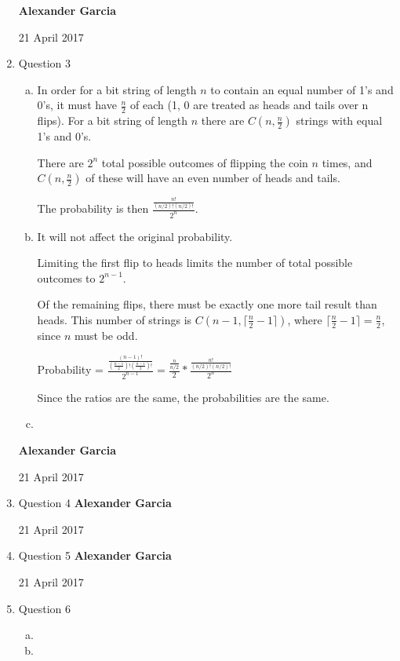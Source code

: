 \documentclass[11pt]{article}
\begin{document}
\begin{enumerate}
\begin{enumerate}[(a)]
			\end{enumerate}
\newpage
\textbf{Alexander Garcia}

21 April 2017 \\

		\item Question 3

			\begin{enumerate}[(a)]

				\item In order for a bit string of length $n$ to contain an equal number of 1's and 0's,
					it must have $\frac{n}{2}$ of each (1, 0 are treated as heads and tails over n flips).
					For a bit string of length $n$ there are $C(n, \frac{n}{2})$ strings with equal 1's and
					0's.

					There are $2^n$ total possible outcomes of flipping the coin $n$ times, and
					$C(n, \frac{n}{2})$ of these will have an even number of heads and tails.

					The probability is then $\frac{\frac{n!}{(n/2)!(n/2)!}}{2^n} $. \\

				\item It will not affect the original probability.

					Limiting the first flip to heads limits the number of total
					possible outcomes to $2^{n-1}$.

					Of the remaining flips, there must be exactly one more tail result than heads.
					This number of strings is $C(n-1, \lceil{\frac{n}{2} -1}\rceil)$, where
					$\lceil{\frac{n}{2} -1}\rceil = \frac{n}{2}$, since $n$ must be odd.

					Probability = $\frac{\frac{(n-1)!}{(\frac{n-1}{2})!(\frac{n-1}{2})!}}{2^{n-1}} =
					\frac{\frac{n}{n/2}}{2} * \frac{\frac{n!}{(n/2)!(n/2)!}}{2^n} $

					Since the ratios are the same, the probabilities are the same. \\

				\item

			\end{enumerate}
\newpage
\textbf{Alexander Garcia}

21 April 2017 \\

		\item Question 4
\newpage
\textbf{Alexander Garcia}

21 April 2017 \\

		\item Question 5
\newpage
\textbf{Alexander Garcia}

21 April 2017 \\

		\item Question 6

			\begin{enumerate}[(a)]

				\item

				\item

			\end{enumerate}

	\end{enumerate}
\end{document}

